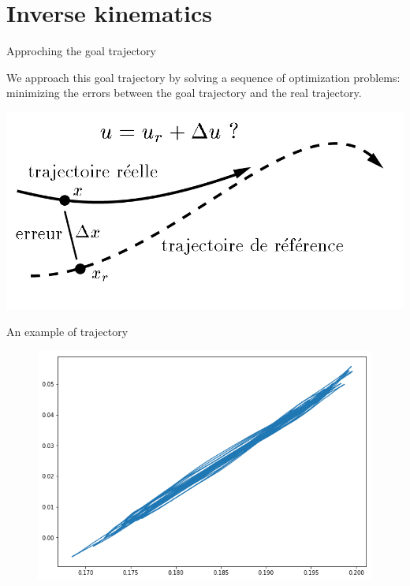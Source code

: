\documentclass{beamer}
\begin{document}
%
%
\section{Inverse kinematics}


\begin{frame}{Approching the goal trajectory}

	We approach this goal trajectory by solving a sequence of optimization problems: minimizing the errors between the goal trajectory and the real trajectory.
	\medskip

	\includegraphics[scale = 0.4]{tracking.jpg}\cite{2}
\end{frame}

\begin{frame}{An example of trajectory}
\begin{figure}
	\centering
	\includegraphics[width=0.8\linewidth]{path}
\end{figure}
\end{frame}
\end{document}

